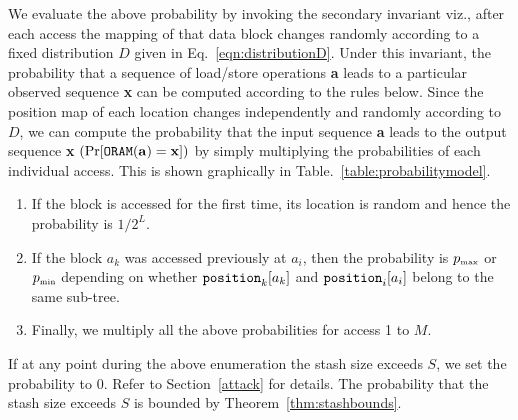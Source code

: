 \documentclass[USenglish,oneside,twocolumn]{article}
\begin{document}
We evaluate the above probability by invoking the secondary invariant viz., after each access the mapping of that data block changes randomly according to a fixed distribution $D$ given in Eq.~\ref{eqn:distributionD}. Under this invariant, the probability that a sequence of load/store operations \textbf{a} leads to a particular observed sequence \textbf{x} can be computed according to the rules below. Since the position map of each location changes independently and randomly according to $D$, we can compute the probability that the input sequence \textbf{a} leads to the output sequence \textbf{x} $(\Pr [{\tt ORAM}(\mathbf{a}) = \mathbf{x}])$ by simply multiplying the probabilities of each individual access. This is shown graphically in Table.~\ref{table:probabilitymodel}.
\vspace{-6pt}
\begin{enumerate}
\item If the block is accessed for the first time, its location is random and hence the probability is $1/2^L$.
\item If the block $a_k$ was accessed previously at $a_i$, then the probability is $p_{{\tiny \mbox{max}}}$ or $p_{{\tiny \mbox{min}}}$ depending on whether ${\tt position}_k[a_k]$ and ${\tt position}_i[a_i]$ belong to the same sub-tree.
\item Finally, we multiply all the above probabilities for access 1 to $M$.
\end{enumerate}
\vspace{-6pt}
If at any point during the above enumeration the stash size exceeds $S$, we set the probability to 0. Refer to Section~\ref{attack} for details. The probability that the stash size exceeds $S$ is bounded by Theorem~\ref{thm:stashbounds}.



\begin{table}
\centering
{}
\caption{\textbf{Demonstration of probabilities given real and observed access patterns \textbf{a, o} respectively. Different symbols for real and observed access patterns are merely for the sake of clarity. Primed symbols are used to denote leaves belonging to the same sub-tree (ex: a, a'). Only the blue symbols affect the probability of the boxed data block. The red elements show the previous and next access of the boxed data block.}}
\label{table:probabilitymodel}
\end{table}
\end{document}
